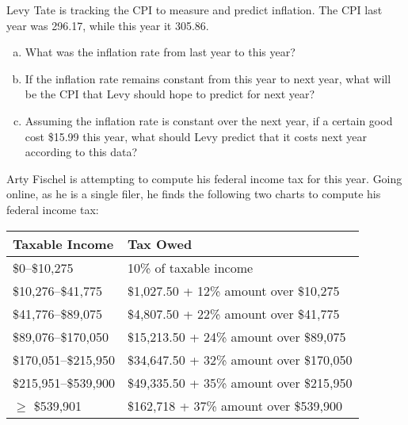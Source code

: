 \documentclass[11pt,letterpaper]{article}
\begin{document}

 Levy Tate is tracking the CPI to measure and predict inflation. The CPI last year was 296.17, while this year it 305.86. 
	\begin{enumerate}[(a)]
	\item What was the inflation rate from last year to this year?
	\item If the inflation rate remains constant from this year to next year, what will be the CPI that Levy should hope to predict for next year?
	\item Assuming the inflation rate is constant over the next year, if a certain good cost \$15.99 this year, what should Levy predict that it costs next year according to this data?
	\end{enumerate}



\newpage



 Arty Fischel is attempting to compute his federal income tax for this year. Going online, as he is a single filer, he finds the following two charts to compute his federal income tax: \par
	\begin{table}[!ht]
	\centering
	\begin{tabular}{|l|l|} \hline
	Taxable Income & Tax Owed \\ \hline \hline
	\$0--\$10,275 & 10\% of taxable income \\ \hline
	\$10,276--\$41,775 & \$1,027.50 + 12\% amount over \$10,275 \\ \hline
	\$41,776--\$89,075 & \$4,807.50 + 22\% amount over \$41,775 \\ \hline
	\$89,076--\$170,050 & \$15,213.50 + 24\% amount over \$89,075 \\ \hline
	\$170,051--\$215,950 & \$34,647.50 + 32\% amount over \$170,050 \\ \hline
	\$215,951--\$539,900 & \$49,335.50 + 35\% amount over \$215,950 \\ \hline
	$\geq$ \$539,901 & \$162,718 + 37\% amount over \$539,900 \\ \hline
	\end{tabular}
	\end{table}
\end{document}
